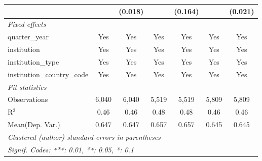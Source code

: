 \begin{tabular}{lcccccc}
                                      &             & (0.018)        &         & (0.164)       &             & (0.021)\\   
   \midrule
   \emph{Fixed-effects}\\
   quarter\_year                      & Yes         & Yes            & Yes     & Yes           & Yes         & Yes\\  
   institution                        & Yes         & Yes            & Yes     & Yes           & Yes         & Yes\\  
   institution\_type                  & Yes         & Yes            & Yes     & Yes           & Yes         & Yes\\  
   institution\_country\_code         & Yes         & Yes            & Yes     & Yes           & Yes         & Yes\\  
   \midrule
   \emph{Fit statistics}\\
   Observations                       & 6,040       & 6,040          & 5,519   & 5,519         & 5,809       & 5,809\\  
   R$^2$                              & 0.46        & 0.46           & 0.48    & 0.48          & 0.46        & 0.46\\  
Mean(Dep. Var.) & 0.647 & 0.647 & 0.657 & 0.657 & 0.645 & 0.645 \\
   \midrule \midrule
   \multicolumn{7}{l}{\emph{Clustered (author) standard-errors in parentheses}}\\
   \multicolumn{7}{l}{\emph{Signif. Codes: ***: 0.01, **: 0.05, *: 0.1}}\\
\end{tabular}
\par\endgroup
